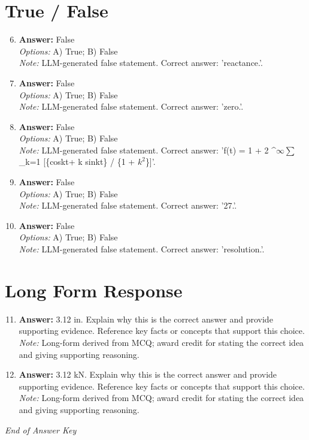 \documentclass[12pt]{article}
\begin{document}
\section*{True / False}
\begin{enumerate}[label=\arabic*.]
\setcounter{enumi}{5}
\item \textbf{Answer:} False
\\ \textit{Options:} A) True; B) False
\\ \textit{Note:} LLM-generated false statement. Correct answer: 'reactance.'.
\item \textbf{Answer:} False
\\ \textit{Options:} A) True; B) False
\\ \textit{Note:} LLM-generated false statement. Correct answer: 'zero.'.
\item \textbf{Answer:} False
\\ \textit{Options:} A) True; B) False
\\ \textit{Note:} LLM-generated false statement. Correct answer: 'f(t) = 1 + 2 ^\ensuremath{\infty}\ensuremath{\sum}\_k=1 [\{coskt+ k sinkt\} / \{1 + $k^2$\}]'.
\item \textbf{Answer:} False
\\ \textit{Options:} A) True; B) False
\\ \textit{Note:} LLM-generated false statement. Correct answer: '27.'.
\item \textbf{Answer:} False
\\ \textit{Options:} A) True; B) False
\\ \textit{Note:} LLM-generated false statement. Correct answer: 'resolution.'.
\end{enumerate}

\section*{Long Form Response}
\begin{enumerate}[label=\arabic*.]
\setcounter{enumi}{10}
\item \textbf{Answer:} 3.12 in. Explain why this is the correct answer and provide supporting evidence. Reference key facts or concepts that support this choice.
\\ \textit{Note:} Long-form derived from MCQ; award credit for stating the correct idea and giving supporting reasoning.
\item \textbf{Answer:} 3.12 kN. Explain why this is the correct answer and provide supporting evidence. Reference key facts or concepts that support this choice.
\\ \textit{Note:} Long-form derived from MCQ; award credit for stating the correct idea and giving supporting reasoning.
\end{enumerate}

\vfill
\noindent\textit{End of Answer Key}
\end{document}
